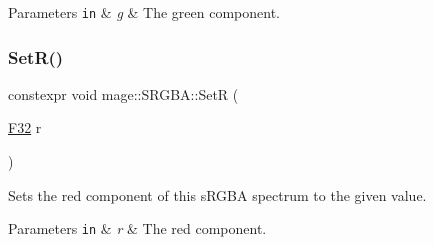 \begin{DoxyParams}[1]{Parameters}
\mbox{\tt in}  & {\em g} & The green component. \\
\hline
\end{DoxyParams}
\mbox{\label{structmage_1_1_s_r_g_b_a_a5716004c31803848e5a0b50fee5bee55}} 
\subsubsection{\texorpdfstring{Set\+R()}{SetR()}}
{\footnotesize\ttfamily constexpr void mage\+::\+S\+R\+G\+B\+A\+::\+SetR (\begin{DoxyParamCaption}\item[{\mbox{\hyperlink{namespacemage_aa97e833b45f06d60a0a9c4fc22ae02c0}{F32}}}]{r }\end{DoxyParamCaption})\hspace{0.3cm}{\ttfamily [noexcept]}}

Sets the red component of this s\+R\+G\+BA spectrum to the given value.


\begin{DoxyParams}[1]{Parameters}
\mbox{\tt in}  & {\em r} & The red component. \\
\hline
\end{DoxyParams}
